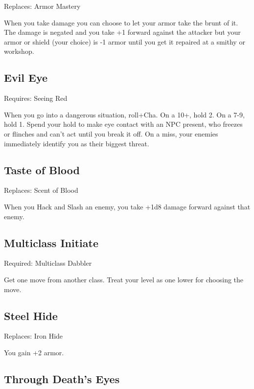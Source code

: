 Replaces: Armor Mastery

 

When you take damage you can choose to let your armor take the brunt of it. The damage is negated and you take +1 forward against the attacker but your armor or shield (your choice) is -1 armor until you get it repaired at a smithy or workshop.

 
\subsection{Evil Eye}    
 

Requires: Seeing Red

 

When you go into a dangerous situation, roll+Cha. On a 10+, hold 2. On a 7-9, hold 1. Spend your hold to make eye contact with an NPC present, who freezes or flinches and can't act until you break it off. On a miss, your enemies immediately identify you as their biggest threat.

 
\subsection{Taste of Blood}    
 

Replaces: Scent of Blood

 

When you Hack and Slash an enemy, you take +1d8 damage forward against that enemy.

 
\subsection{Multiclass Initiate}    
 

Required: Multiclass Dabbler

 

Get one move from another class. Treat your level as one lower for choosing the move.

 
\subsection{Steel Hide}    
 

Replaces: Iron Hide

 

You gain +2 armor.

 
\subsection{Through Death's Eyes}    
 

